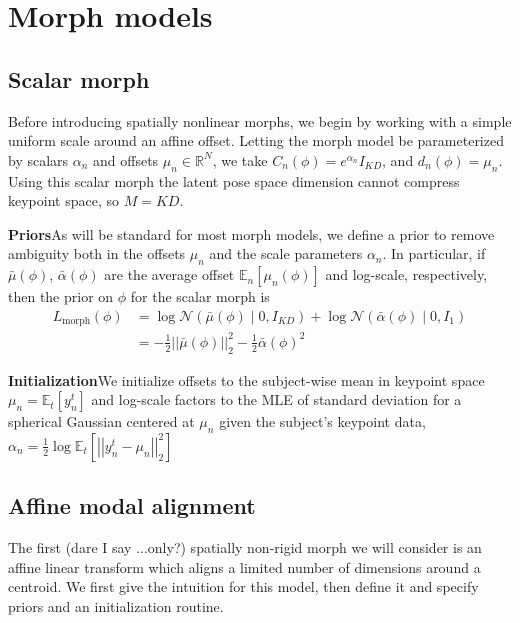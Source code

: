 \documentclass{article}         %
\newcommand{\EE}{\mathbb{E}}
\newcommand{\RR}{\mathbb{R}}
\newcommand{\NN}{\mathcal{N}}
\newcommand{\norm}[1]{\left|\left| #1 \right|\right|}
\newcommand{\pn}[1]{\left( #1 \right)}
\newcommand{\bc}[1]{\left[ #1 \right]}
\begin{document}
\section{Morph models}

\subsection{Scalar morph}

Before introducing spatially nonlinear morphs, we begin by working with a simple uniform scale around an affine offset. Letting the morph model be parameterized by scalars $\alpha_n$ and offsets $\mu_n\in \RR^N$, we take $C_n(\phi) = e^{\alpha_n} I_{KD}$, and $d_n(\phi) = \mu_n$. Using this scalar morph the latent pose space dimension cannot compress keypoint space, so $M = KD$.

\textbf{Priors}\quad As will be standard for most morph models, we define a prior to remove ambiguity both in the offsets $\mu_n$ and the scale parameters $\alpha_n$. In particular, if $\bar{\mu}(\phi)$, $\bar{\alpha}(\phi)$ are the average offset $\EE_n\bc{\mu_n(\phi)}$ and log-scale, respectively, then the prior on $\phi$ for the scalar morph is
\begin{align}
    L_{\text{morph}}(\phi) &= \log \NN\pn{\bar{\mu}(\phi) \mid 0, I_{KD}} + \log \NN\pn{\bar{\alpha}(\phi) \mid 0, I_1} \\
    &= -\frac{1}{2}\norm{\bar{\mu}(\phi)}_2^2 - \frac{1}{2}\bar{\alpha}(\phi)^2
    \label{eq:d-alpha-prior}
\end{align}

\textbf{Initialization}\quad We initialize offsets to the subject-wise mean in keypoint space $\mu_n = \EE_t[y^t_n]$ and log-scale factors to the MLE of standard deviation for a spherical Gaussian centered at $\mu_n$ given the subject's keypoint data, $\alpha_n = \frac{1}{2}\log\EE_t[\norm{y^t_n - \mu_n}_2^2]$

\subsection{Affine modal alignment}

The first (dare I say ...only?) spatially non-rigid morph we will consider is an affine linear transform which aligns a limited number of dimensions around a centroid. We first give the intuition for this model, then define it and specify priors and an initialization routine.
\end{document}
